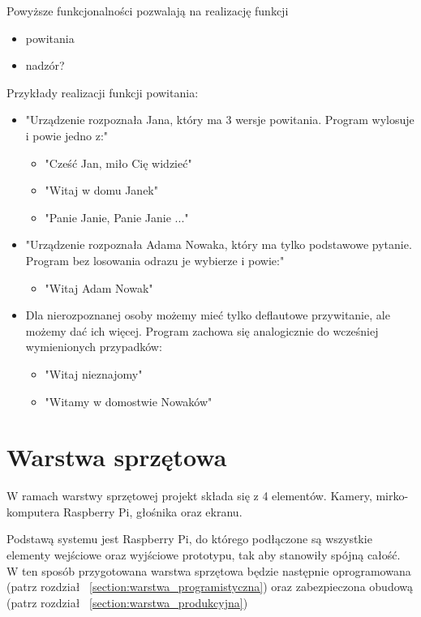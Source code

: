 \documentclass[a4paper,12pt,reqno]{article}
\begin{document}
Powyższe funkcjonalności pozwalają na realizację funkcji

\begin{itemize}
	\item powitania
	\item nadzór\textcolor{to_check_at_end}{?}
\end{itemize}

Przykłady realizacji funkcji powitania:
\begin{itemize}
	\item "Urządzenie rozpoznała Jana, który ma 3 wersje powitania. Program wylosuje i powie jedno z:"
	\begin{itemize}
		\item "Cześć Jan, miło Cię widzieć"
		\item "Witaj w domu Janek"
		\item "Panie Janie, Panie Janie ..." %
	\end{itemize}
	\item "Urządzenie rozpoznała Adama Nowaka, który ma tylko podstawowe pytanie. Program bez losowania odrazu je wybierze i powie:"
	\begin{itemize}
		\item "Witaj Adam Nowak"
	\end{itemize}
	\item Dla nierozpoznanej osoby możemy mieć tylko deflautowe przywitanie, ale możemy dać ich więcej. Program zachowa się analogicznie do wcześniej wymienionych przypadków:
	\begin{itemize}
		\item "Witaj nieznajomy"
		\item "Witamy w domostwie Nowaków"
	\end{itemize}
\end{itemize}

\newpage
\section{Warstwa sprzętowa} \label{section:warstwa_sprzetowa}

W ramach warstwy sprzętowej projekt składa się z 4 elementów. Kamery, mirko-komputera Raspberry Pi, głośnika oraz ekranu.

Podstawą systemu jest Raspberry Pi, do którego podłączone są wszystkie elementy wejściowe oraz wyjściowe prototypu, tak aby stanowiły spójną całość. W ten sposób przygotowana warstwa sprzętowa będzie następnie oprogramowana (patrz rozdział ~\ref{section:warstwa_programistyczna}) oraz zabezpieczona obudową (patrz rozdział ~\ref{section:warstwa_produkcyjna})
\end{document}
